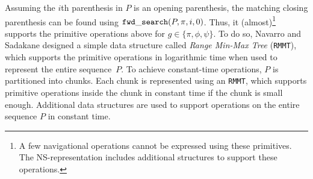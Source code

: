 Assuming the $i$th parenthesis in $P$ is an opening parenthesis, the
matching closing parenthesis can be found using
$\mathtt{fwd\_search}(P,\pi,i,0)$.  Thus, it (almost)\footnote{A few
  navigational operations cannot be expressed using these primitives.
  The NS-representation includes additional structures to support
  these operations.}  supports the primitive operations above for
$g \in \{\pi, \phi, \psi\}$.  To do so, Navarro and Sadakane designed
a simple data structure called \emph{Range Min-Max Tree} ({\tt RMMT}),
which supports the primitive operations in logarithmic time when used
to represent the entire sequence~$P$.  To achieve constant-time
operations, $P$ is partitioned into chunks.  Each chunk is represented
using an {\tt RMMT}, which supports primitive operations inside the
chunk in constant time if the chunk is small enough.  Additional data
structures are used to support operations on the entire sequence $P$
in constant time.

